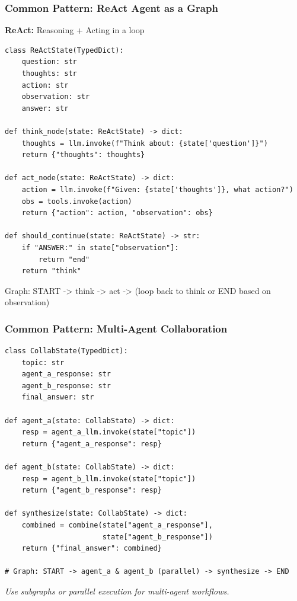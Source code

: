 \documentclass[aspectratio=169,11pt]{beamer}
\begin{document}
\begin{frame}[fragile]
\frametitle{Common Pattern: ReAct Agent as a Graph}
\textbf{ReAct:} Reasoning + Acting in a loop

\vspace{10pt}
\begin{lstlisting}
class ReActState(TypedDict):
    question: str
    thoughts: str
    action: str
    observation: str
    answer: str

def think_node(state: ReActState) -> dict:
    thoughts = llm.invoke(f"Think about: {state['question']}")
    return {"thoughts": thoughts}

def act_node(state: ReActState) -> dict:
    action = llm.invoke(f"Given: {state['thoughts']}, what action?")
    obs = tools.invoke(action)
    return {"action": action, "observation": obs}

def should_continue(state: ReActState) -> str:
    if "ANSWER:" in state["observation"]:
        return "end"
    return "think"
\end{lstlisting}

Graph: START -> think -> act -> (loop back to think or END based on observation)
\end{frame}

\begin{frame}[fragile]
\frametitle{Common Pattern: Multi-Agent Collaboration}
\begin{lstlisting}
class CollabState(TypedDict):
    topic: str
    agent_a_response: str
    agent_b_response: str
    final_answer: str

def agent_a(state: CollabState) -> dict:
    resp = agent_a_llm.invoke(state["topic"])
    return {"agent_a_response": resp}

def agent_b(state: CollabState) -> dict:
    resp = agent_b_llm.invoke(state["topic"])
    return {"agent_b_response": resp}

def synthesize(state: CollabState) -> dict:
    combined = combine(state["agent_a_response"],
                       state["agent_b_response"])
    return {"final_answer": combined}

# Graph: START -> agent_a & agent_b (parallel) -> synthesize -> END
\end{lstlisting}

\textit{Use subgraphs or parallel execution for multi-agent workflows.}
\end{frame}
\end{document}
